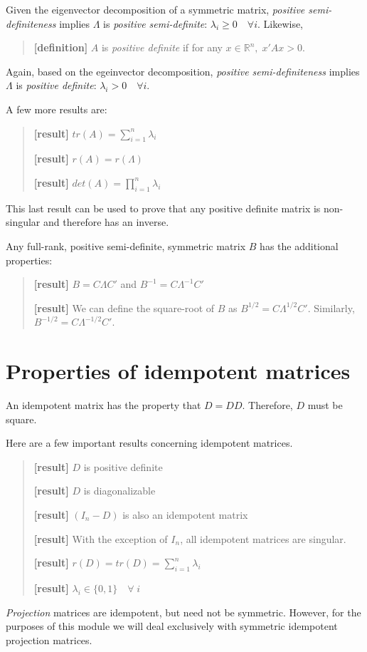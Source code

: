 \documentclass[
  letterpaper,
  DIV=11,
  numbers=noendperiod]{scrreprt}
\begin{document}
Given the eigenvector decomposition of a symmetric matrix,
\emph{positive semi-definiteness} implies \(\Lambda\) is \emph{positive
semi-definite}: \(\lambda_i\geq0\quad\forall i\). Likewise,

\begin{quote}
\textbf{{[}definition{]}} \(A\) is \emph{positive definite} if for any
\(x\in\mathbb{R}^n,\;x'Ax>0\).
\end{quote}

Again, based on the egeinvector decomposition, \emph{positive
semi-definiteness} implies \(\Lambda\) is \emph{positive definite}:
\(\lambda_i>0\quad\forall i\).

A few more results are:

\begin{quote}
\textbf{{[}result{]}} \(tr(A) = \sum_{i=1}^n\lambda_i\)

\textbf{{[}result{]}} \(r(A) = r(\Lambda)\)

\textbf{{[}result{]}} \(det(A) = \prod_{i=1}^n \lambda_i\)
\end{quote}

This last result can be used to prove that any positive definite matrix
is non-singular and therefore has an inverse.

Any full-rank, positive semi-definite, symmetric matrix \(B\) has the
additional properties:

\begin{quote}
\textbf{{[}result{]}} \(B=C\Lambda C'\) and \(B^{-1} = C\Lambda^{-1}C'\)

\textbf{{[}result{]}} We can define the square-root of \(B\) as
\(B^{1/2} = C\Lambda^{1/2}C'\). Similarly,
\(B^{-1/2} = C\Lambda^{-1/2}C'\).
\end{quote}

\hypertarget{properties-of-idempotent-matrices}{%
\section{Properties of idempotent
matrices}\label{properties-of-idempotent-matrices}}

An idempotent matrix has the property that \(D=DD\). Therefore, \(D\)
must be square.

Here are a few important results concerning idempotent matrices.

\begin{quote}
\textbf{{[}result{]}} \(D\) is positive definite

\textbf{{[}result{]}} \(D\) is diagonalizable

\textbf{{[}result{]}} \((I_n-D)\) is also an idempotent matrix

\textbf{{[}result{]}} With the exception of \(I_n\), all idempotent
matrices are singular.

\textbf{{[}result{]}} \(r(D) = tr(D) = \sum_{i=1}^n\lambda_i\)

\textbf{{[}result{]}} \(\lambda_i\in\{0,1\}\quad \forall\;i\)
\end{quote}

\emph{Projection} matrices are idempotent, but need not be symmetric.
However, for the purposes of this module we will deal exclusively with
symmetric idempotent projection matrices.
\end{document}
